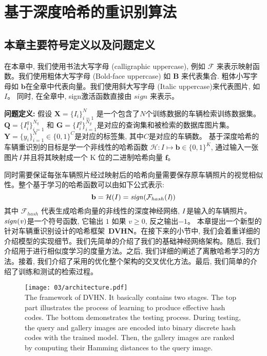 \section{基于深度哈希的重识别算法}
\subsection{本章主要符号定义以及问题定义}
在本章中, 我们使用书法大写字母 (calligraphic uppercase), 例如 $\mathcal{F}$ 来表示映射函数。我们使用粗体大写字母 (Bold-face uppercase) 如 $\mathbf{B}$ 来代表集合. 粗体小写字母如 $\mathbf{b}$在全章中代表向量。我们使用斜大写字母 (Italic uppercase)来代表图片, 如 $\textit{I}$。 同时, 在全章中, sign激活函数直接由 $\textit{sign}$ 来表示。\par
\textbf{问题定义:} 假设 $\mathbf{X} = \{\textit{I}_i\}^N_{i=1}$ 是一个包含了$N$个训练数据的车辆检索训练数据集。 $\mathbf{Q} = \{I_i^q\}^{N_{q}}_{i=1}$ 和 $\mathbf{G} = \{I^g_i\}^{N_{g}}_{i=1}$是对应的查询集和被检索的数据库图片集。$\mathbf{Y} = \{\textit{y}_i\}^N_{i=1} \in \{0,1\}^C$是对应的标签集, 其中$C$是对应的车辆数。 基于深度哈希的车辆重识别的目标是学一个非线性的哈希函数 $\mathcal{H}: I \mapsto \mathbf{b} \in \{0,1\}^K $, 通过输入一张图片$\it{I}$并且将其映射成一个 K 位的二进制哈希向量 
$\mathbf{f}$。

同时需要保证每张车辆照片经过映射后的哈希向量需要保存原车辆照片的视觉相似性。整个基于学习的哈希函数可以由如下公式表示:
\begin{equation*}
    \mathbf{b}  = \mathcal{H}(I) = \mathbf{\it{sign}} (\mathcal{F}_{hash}(\textit{I})) 
\end{equation*}
其中 $\mathcal{F}_{hash}$ 代表生成哈希向量的非线性的深度神经网络, $\it{I}$是输入的车辆照片。 $\mathbf{\it{sign}(v)}$是一个符号函数, 它输出 $1$ 如果 $v \geq 0$, 反之输出$-1$。
本章提出一个新型的针对车辆重识别设计的哈希框架~\textbf{DVHN}。在接下来的小节中, 我们会着重详细的介绍模型的实现细节。我们先简单的介绍了我们的基础神经网络架构。随后, 我们介绍用于进行相似度学习的度量方法。之后, 我们详细的阐述了离散哈希学习的方法。接着, 我们介绍了采用的优化整个架构的交叉优化方法。最后, 我们简单的介绍了训练和测试的检索过程。
\begin{figure}[!htp]
    \centering
    \texttt{[image: 03/architecture.pdf]} \\
      {The framework of DVHN. It basically contains two stages. The top part illustrates the process of learning to produce effective hash codes. The
      bottom demonstrates the testing process. During testing, the query and gallery images are encoded into binary discrete hash codes with the trained model.
      Then, the gallery images are ranked by computing their Hamming distances to the query image.}
   \label{fig:archvehicle}
\end{figure} 
